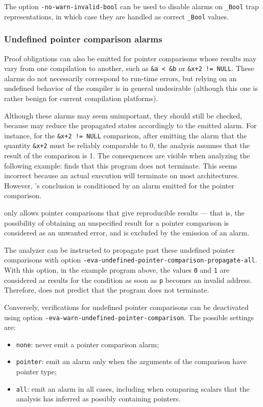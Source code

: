 \documentclass{frama-c-book}
\begin{document}
The option \lstinline|-no-warn-invalid-bool| can be used to disable alarms
on \texttt{\_Bool} trap representations, in which case they are handled as
correct \texttt{\_Bool} values.

\subsubsection{Undefined pointer comparison alarms}
Proof obligations can also be emitted
for pointer comparisons whose results may vary
from one compilation to another, such as \lstinline|&a < &b|
or \lstinline|&x+2 != NULL|.
These alarms do not necessarily
correspond to run-time errors, but relying on an undefined
behavior of the compiler is in general undesirable (although
this one is rather benign for current compilation platforms).

Although these alarms may seem unimportant, they should still be
checked, because \Eva{} may reduce the propagated states
accordingly to the emitted alarm. For instance, for the
\lstinline|&x+2 != NULL| comparison, after emitting the alarm that the
quantity \lstinline|&x+2| must be reliably comparable to 0, the
analysis assumes that the result of the comparison is 1. The
consequences are visible when analyzing the following example:
\Eva{} finds that this program does not terminate.
This seems incorrect because an actual execution will terminate
on most architectures.
However, \Eva{}'s conclusion is conditioned by
an alarm emitted for the pointer comparison.

\Eva{} only allows pointer comparisons that give
reproducible results --- that is, the possibility of obtaining an
unspecified result for a pointer comparison is considered as an
unwanted error, and is excluded by the emission of an alarm.

The analyzer can be instructed to propagate past these undefined
pointer comparisons with
option \lstinline|-eva-undefined-pointer-comparison-propagate-all|.
With this option, in the example program above,
the values \lstinline|0| and \lstinline|1| are considered as results
for the condition as soon as \lstinline|p| becomes an invalid address.
Therefore, \Eva{} does not predict that the program
does not terminate.

Conversely, verifications for undefined pointer comparisons can be
deactivated using option \lstinline|-eva-warn-undefined-pointer-comparison|.
The possible settings are:
\begin{itemize}
\item \lstinline|none|: never emit a pointer comparison alarm;
\item \lstinline|pointer|: emit an alarm only when the arguments of the
comparison have pointer type;
\item \lstinline|all|: emit an alarm in all cases, including when comparing
scalars that the analysis has inferred as possibly containing pointers.
\end{itemize}
\end{document}
